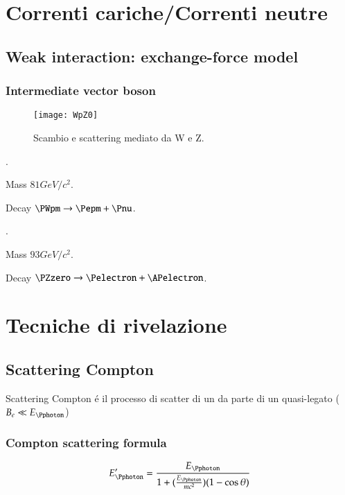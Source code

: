 \documentclass[main.tex]{subfiles}
\begin{document}
\chapter{Correnti cariche/Correnti neutre}

\section{Weak interaction: exchange-force model}

\subsection{Intermediate vector boson}

\begin{figure}[!ht]
\centering
\texttt{[image: WpZ0]}
\caption{Scambio e scattering mediato da W e Z.}
\end{figure}

\begin{itemize*}
\item \PWpm.

Mass $81GeV/c^2$.

Decay $\PWpm\to\Pepm+\Pnu$.

\item \PZzero.

Mass $93GeV/c^2$.

Decay $\PZzero\to\Pelectron+\APelectron$.

\end{itemize*}

\chapter{Tecniche di rivelazione}

\section{Scattering Compton}

Scattering Compton \'e il processo di scatter di un \Pphoton da parte di un \Pelectron quasi-legato ($B_e\ll E_{\Pphoton}$)

\subsection{Compton scattering formula}

\begin{equation*}
E_{\Pphoton}'=\frac{E_{\Pphoton}}{1+(\frac{E_{\Pphoton}}{mc^2})(1-\cos{\theta})}
\end{equation*}
\end{document}
